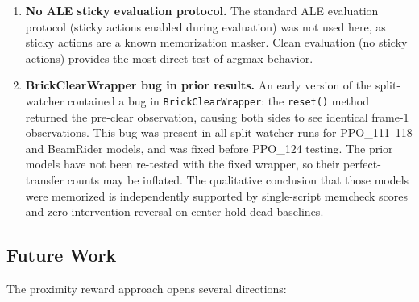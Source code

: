 \documentclass[11pt]{article}
\begin{document}
\begin{enumerate}
    transfers result is qualitatively clear, but formal statistical treatment
    would strengthen the conclusions. Intervention gradient reversal rates
    are reported without per-magnitude sample sizes; these should be
    interpreted as exploratory.
    \item \textbf{No ALE sticky evaluation protocol.} The standard ALE
    evaluation protocol (sticky actions enabled during evaluation) was not
    used here, as sticky actions are a known memorization masker. Clean
    evaluation (no sticky actions) provides the most direct test of argmax
    behavior.
    \item \textbf{BrickClearWrapper bug in prior results.} An early version of
    the split-watcher contained a bug in \texttt{BrickClearWrapper}: the
    \texttt{reset()} method returned the pre-clear observation, causing both
    sides to see identical frame-1 observations. This bug was present in all
    split-watcher runs for PPO\_111--118 and BeamRider models, and was fixed
    before PPO\_124 testing. The prior models have not been re-tested with
    the fixed wrapper, so their perfect-transfer counts may be inflated.
    The qualitative conclusion that those models were memorized is
    independently supported by single-script memcheck scores and zero
    intervention reversal on center-hold dead baselines.
\end{enumerate}

\subsection{Future Work}

The proximity reward approach opens several directions:
\end{document}
